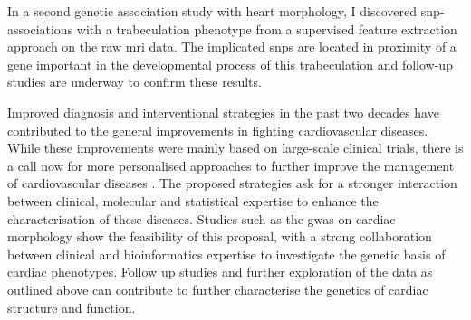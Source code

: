 In a second genetic association study with heart morphology, I discovered \gls{snp}- associations with a trabeculation phenotype from a supervised feature extraction approach on the raw \gls{mri} data. The implicated \glspl{snp} are located in proximity of a gene important in the developmental process of this trabeculation and follow-up studies are underway to confirm these results.

Improved diagnosis and interventional strategies in the past two decades have contributed to the general improvements in fighting cardiovascular diseases. While these improvements were mainly based on large-scale clinical trials, there is a call now for more personalised approaches to further improve the management of cardiovascular diseases \citep{Meder2016}. The proposed strategies ask for a stronger interaction between clinical, molecular and statistical expertise to enhance the characterisation of these diseases. Studies such as the \gls{gwas} on cardiac morphology show the feasibility of this proposal, with a strong collaboration between clinical and bioinformatics expertise to investigate the genetic basis of cardiac phenotypes. Follow up studies and further exploration of the data as outlined above can contribute to further characterise the genetics of cardiac structure and function. 



